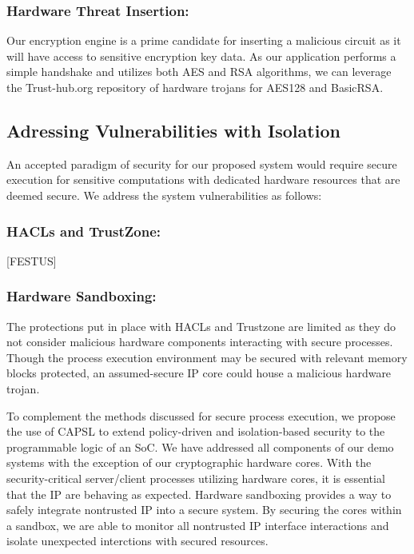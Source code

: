 \documentclass[sigconf]{acmart}
\theoremstyle{plain}
\theoremstyle{remark}
\begin{document}
\subsubsection{Hardware Threat Insertion:}

Our encryption engine is a prime candidate for inserting a malicious circuit as it will have access to sensitive encryption key data. As our application performs a simple handshake and utilizes both AES and RSA algorithms, we can leverage the Trust-hub.org repository of hardware trojans for AES128 and BasicRSA.


\subsection{Adressing Vulnerabilities with Isolation}
An accepted paradigm of security for our proposed system would require secure execution for sensitive computations with dedicated hardware resources that are deemed secure. We address the system vulnerabilities as follows:


\subsubsection{HACLs and TrustZone:}
[FESTUS]

\subsubsection{Hardware Sandboxing:}
The protections put in place with HACLs and Trustzone are limited as they do not consider malicious hardware components interacting with secure processes. Though the process execution environment may be secured with relevant memory blocks protected, an assumed-secure IP core could house a malicious hardware trojan.

To complement the methods discussed for secure process execution, we propose the use of CAPSL to extend policy-driven and isolation-based security to the programmable logic of an SoC. We have addressed all components of our demo systems with the exception of our cryptographic hardware cores. With the security-critical server/client processes utilizing hardware cores, it is essential that the IP are behaving as expected. Hardware sandboxing provides a way to safely integrate nontrusted IP into a secure system. By securing the cores within a sandbox, we are able to monitor all nontrusted IP interface interactions and isolate unexpected interctions with secured resources.
\end{document}
